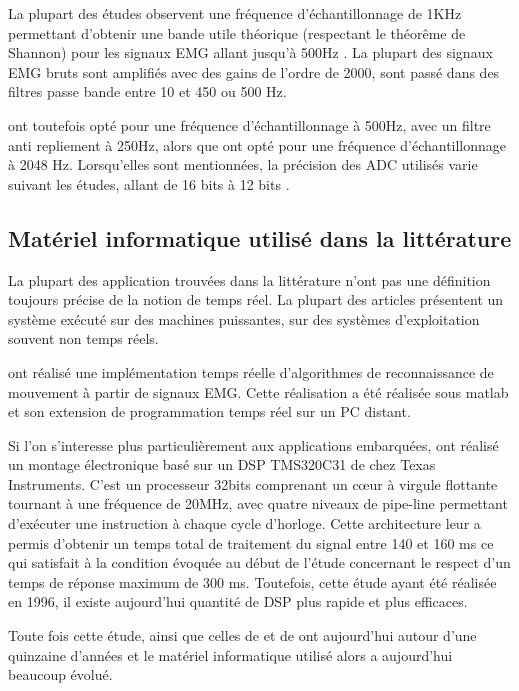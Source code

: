\documentclass[letterpaper, twoside, 12pt, memoire, creativecommons, hyperref]{thETS}
\begin{document}
La plupart des études observent une fréquence d’échantillonnage de 1KHz permettant d’obtenir une bande utile théorique (respectant le théorême de Shannon) pour les signaux EMG allant jusqu’à 500Hz \citep{Chang1996, Chu2007, Englehart2003, Tenore2007}. 
La plupart des signaux EMG bruts sont amplifiés avec des gains de l’ordre de 2000, sont passé dans des filtres passe bande entre 10 et 450 ou 500 Hz.

\cite{Peleg2002} ont toutefois opté pour une fréquence d’échantillonnage à 500Hz, avec un filtre anti repliement à 250Hz, alors que \cite{Crawford2005} ont opté pour une fréquence d’échantillonnage à 2048 Hz.
Lorsqu’elles sont mentionnées, la précision des ADC utilisés varie suivant les études, allant de 16 bits \citep{Englehart2003} à 12 bits \citep{Tenore2007, Fukuda2003, Prasad1996}.


\subsection{Matériel informatique utilisé dans la littérature}

La plupart des application trouvées dans la littérature n'ont pas une définition toujours précise de la notion de temps réel. La plupart des articles présentent un système exécuté sur des machines puissantes, sur des systèmes d'exploitation souvent non temps réels. 

\cite{Englehart2003} ont réalisé une implémentation temps réelle d’algorithmes de reconnaissance de mouvement à partir de signaux EMG. Cette réalisation a été réalisée sous matlab et son extension de programmation temps réel sur un PC distant.

Si l'on s'interesse plus particulièrement aux applications embarquées, \cite{Chang1996} ont réalisé un montage électronique basé sur un DSP TMS320C31 de chez Texas Instruments. C’est un processeur 32bits comprenant un cœur à virgule flottante tournant à une fréquence de 20MHz, avec quatre niveaux de pipe-line permettant d’exécuter une instruction à chaque cycle d’horloge. Cette architecture leur a permis d’obtenir un temps total de traitement du signal entre 140 et 160 ms ce qui satisfait à la condition évoquée au début de l’étude concernant le respect d’un temps de réponse maximum de 300 ms. Toutefois, cette étude ayant été réalisée en 1996, il existe aujourd’hui quantité de DSP plus rapide et plus efficaces.

Toute fois cette étude, ainsi que celles de \cite{martinez1999} et de \cite{prasad1996} ont aujourd'hui autour d'une quinzaine d'années et le matériel informatique utilisé alors a aujourd'hui beaucoup évolué.
\end{document}
